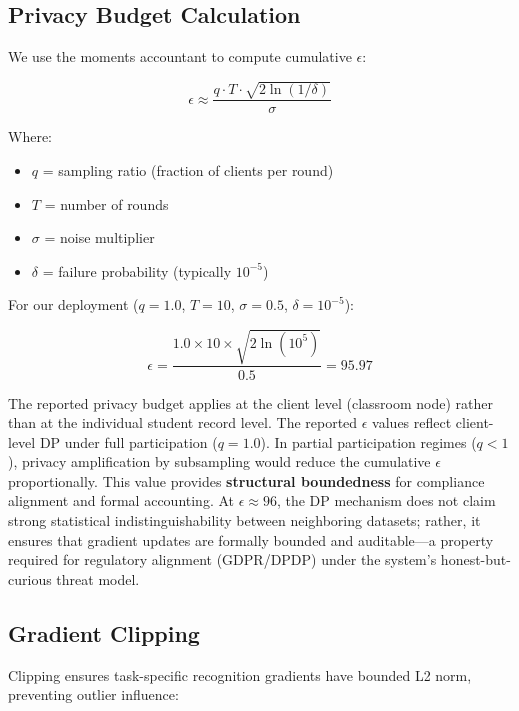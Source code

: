 \documentclass[conference]{IEEEtran}
\begin{document}
\subsection{Privacy Budget Calculation}

We use the moments accountant \cite{b13} to compute cumulative $\epsilon$:

\begin{equation}
\epsilon \approx \frac{q \cdot T \cdot \sqrt{2 \ln(1/\delta)}}{\sigma}
\label{eq:privacy}
\end{equation}

Where:
\begin{itemize}
    \item $q$ = sampling ratio (fraction of clients per round)
    \item $T$ = number of rounds
    \item $\sigma$ = noise multiplier
    \item $\delta$ = failure probability (typically $10^{-5}$)
\end{itemize}

For our deployment ($q=1.0$, $T=10$, $\sigma=0.5$, $\delta=10^{-5}$):

\begin{equation}
\epsilon = \frac{1.0 \times 10 \times \sqrt{2 \ln(10^5)}}{0.5} = 95.97
\end{equation}

The reported privacy budget applies at the client level (classroom node) rather than at the individual student record level. The reported $\epsilon$ values reflect client-level DP under full participation ($q=1.0$). In partial participation regimes ($q < 1$), privacy amplification by subsampling would reduce the cumulative $\epsilon$ proportionally. This value provides \textbf{structural boundedness} for compliance alignment and formal accounting. At $\epsilon \approx 96$, the DP mechanism does not claim strong statistical indistinguishability between neighboring datasets; rather, it ensures that gradient updates are formally bounded and auditable—a property required for regulatory alignment (GDPR/DPDP) under the system's honest-but-curious threat model.

\subsection{Gradient Clipping}

Clipping ensures task-specific recognition gradients have bounded L2 norm, preventing outlier influence:
\end{document}
